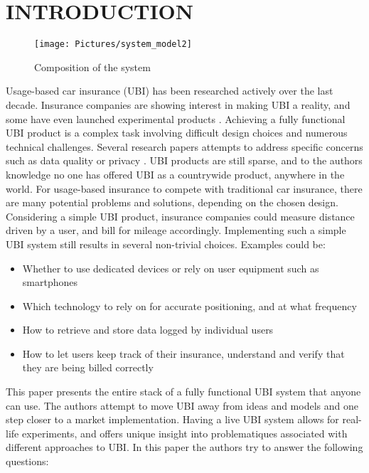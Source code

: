 \section{INTRODUCTION}\label{sec:intro}
\begin{figure}[]
\centering
\texttt{[image: Pictures/system\_model2]}
\caption{Composition of the system}
\label{fig:system_model}
\end{figure}

Usage-based car insurance (UBI) has been researched actively over the last decade. Insurance companies are showing interest in making UBI a reality, and some have even launched experimental products \citep{allstate_ubi} \citep{progressive_ubi} \citep{qbe_ubi}. Achieving a fully functional UBI product is a complex task involving difficult design choices and numerous technical challenges. Several research papers attempts to address specific concerns such as data quality \citep{art:insurtelematics} or privacy \citep{art:pripayd}. UBI products are still sparse, and to the authors knowledge no one has offered UBI as a countrywide product, anywhere in the world.
For usage-based insurance to compete with traditional car insurance, there are many potential problems and solutions, depending on the chosen design. Considering a simple UBI product, insurance companies could measure distance driven by a user, and bill for mileage accordingly. Implementing such a simple UBI system still results in several non-trivial choices. Examples could be:

\begin{itemize}
\item Whether to use dedicated devices or rely on user equipment such as smartphones
\item Which technology to rely on for accurate positioning, and at what frequency
\item How to retrieve and store data logged by individual users
\item How to let users keep track of their insurance, understand and verify that they are being billed correctly
\end{itemize}

This paper presents the entire stack of a fully functional UBI system that anyone can use. The authors attempt to move UBI away from ideas and models and one step closer to a market implementation. Having a live UBI system allows for real-life experiments, and offers unique insight into problematiques associated with different approaches to UBI. In this paper the authors try to answer the following questions:

